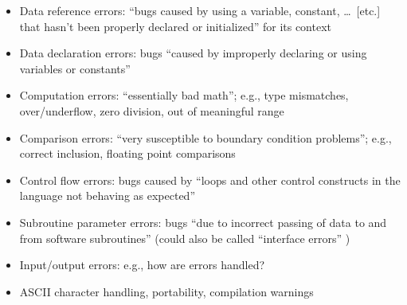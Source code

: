 \begin{itemize}
      \item {}
            \label{data-ref-errors}
            Data reference errors: ``bugs caused by using a variable, constant,
            \dots\ [etc.] that hasn't been properly declared or initialized''
            for its context \citep[p.~99]{Patton2006}
      \item Data declaration errors: bugs ``caused by improperly declaring
            or using variables or constants'' \citep[p.~100]{Patton2006}
      \item Computation errors: ``essentially bad math''; e.g., type mismatches,
            over/underflow, zero division, out of meaningful range
            \citep[p.~101]{Patton2006}
            \label{comp-errors}
      \item Comparison errors: ``very susceptible to boundary condition
            problems''; e.g., correct inclusion, floating point comparisons
            \citep[p.~101]{Patton2006}
      \item Control flow errors: bugs caused by ``loops and other control
            constructs in the language not behaving as expected''
            \citep[p.~102]{Patton2006}
      \item Subroutine parameter errors: bugs ``due to incorrect passing of data
            to and from software subroutines'' \citep[p.~102]{Patton2006}
            (could also be called ``interface errors''
            \citep[p.~416]{vanVliet2000})
      \item Input/output errors: e.g., how are errors handled?
            \citep[pp.~102-103]{Patton2006}
      \item ASCII character handling, portability, compilation warnings
            \citep[p.~103]{Patton2006}
\end{itemize}

